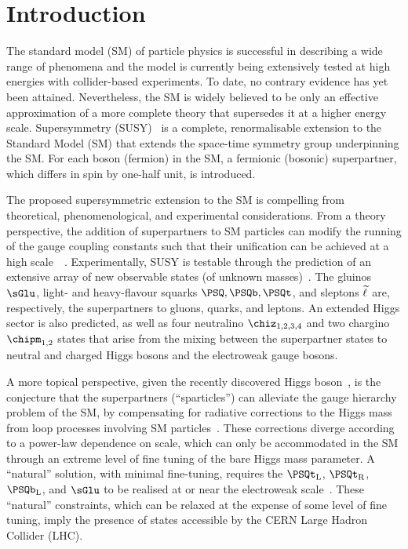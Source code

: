\section{Introduction}
\label{sec:introduction}

The standard model (SM) of particle physics is successful in
describing a wide range of phenomena and the model is currently being
extensively tested at high energies with collider-based experiments.
To date, no contrary evidence has yet been attained. Nevertheless, the
SM is widely believed to be only an effective approximation of a more
complete theory that supersedes it at a higher energy
scale. Supersymmetry (SUSY)~\cite{ref:SUSY-1, ref:SUSY0, ref:SUSY3,
  ref:SUSY1} is a complete, renormalisable extension to the Standard
Model (SM) that extends the space-time symmetry group underpinning the
SM. For each boson (fermion) in the SM, a fermionic (bosonic)
superpartner, which differs in spin by one-half unit, is introduced.

The proposed supersymmetric extension to the SM is compelling from
theoretical, phenomenological, and experimental considerations.  From
a theory perspective, the addition of superpartners to SM particles
can modify the running of the gauge coupling constants such that their
unification can be achieved at a high scale~~\cite{Dimopoulos:1981yj,
  Ibanez:1981yh, Marciano:1981un}.  Experimentally, SUSY is testable
through the prediction of an extensive array of new observable states
(of unknown masses)~\cite{ref:SUSY4, ref:SUSY2}. The gluinos $\sGlu$,
light- and heavy-flavour squarks $\PSQ, \PSQb, \PSQt$, and sleptons
$\PSl$ are, respectively, the superpartners to gluons, quarks, and
leptons. An extended Higgs sector is also predicted, as well as four
neutralino $\chiz_{1,2,3,4}$ and two chargino $\chipm_{1,2}$ states
that arise from the mixing between the superpartner states to neutral
and charged Higgs bosons and the electroweak gauge bosons.

A more topical perspective, given the recently discovered Higgs
boson~\cite{ref:atlashiggsdiscovery, ref:cmshiggsdiscoverylong}, is
the conjecture that the superpartners (``sparticles'') can alleviate
the gauge hierarchy problem of the SM, by compensating for radiative
corrections to the Higgs mass from loop processes involving SM
particles~\cite{ref:hierarchy1, ref:hierarchy2}. These corrections
diverge according to a power-law dependence on scale, which can only
be accommodated in the SM through an extreme level of fine tuning of
the bare Higgs mass parameter. A ``natural'' solution, with minimal
fine-tuning, requires the $\PSQt_\text{L}$, $\PSQt_\text{R}$,
$\PSQb_\text{L}$, and $\sGlu$ to be realised at or near the
electroweak scale~\cite{ref:barbierinsusy}. These ``natural''
constraints, which can be relaxed at the expense of some level of fine
tuning, imply the presence of states accessible by the CERN Large
Hadron Collider (LHC). 


